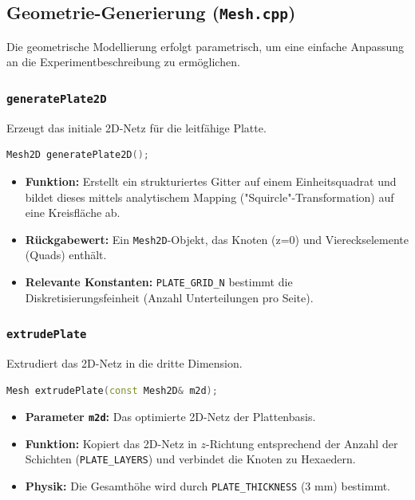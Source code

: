 \documentclass[a4paper,12pt]{article}
\begin{document}
\subsection{Geometrie-Generierung (\texttt{Mesh.cpp})}

Die geometrische Modellierung erfolgt parametrisch, um eine einfache Anpassung an die Experimentbeschreibung zu ermöglichen.

\subsubsection{\texttt{generatePlate2D}}
Erzeugt das initiale 2D-Netz für die leitfähige Platte.
\begin{lstlisting}[language=C++]
Mesh2D generatePlate2D();
\end{lstlisting}
\begin{itemize}
    \item \textbf{Funktion:} Erstellt ein strukturiertes Gitter auf einem Einheitsquadrat und bildet dieses mittels analytischem Mapping ("Squircle"-Transformation) auf eine Kreisfläche ab.
    \item \textbf{Rückgabewert:} Ein \texttt{Mesh2D}-Objekt, das Knoten (z=0) und Viereckselemente (Quads) enthält.
    \item \textbf{Relevante Konstanten:} \texttt{PLATE\_GRID\_N} bestimmt die Diskretisierungsfeinheit (Anzahl Unterteilungen pro Seite).
\end{itemize}

\subsubsection{\texttt{extrudePlate}}
Extrudiert das 2D-Netz in die dritte Dimension.
\begin{lstlisting}[language=C++]
Mesh extrudePlate(const Mesh2D& m2d);
\end{lstlisting}
\begin{itemize}
    \item \textbf{Parameter \texttt{m2d}:} Das optimierte 2D-Netz der Plattenbasis.
    \item \textbf{Funktion:} Kopiert das 2D-Netz in $z$-Richtung entsprechend der Anzahl der Schichten (\texttt{PLATE\_LAYERS}) und verbindet die Knoten zu Hexaedern.
    \item \textbf{Physik:} Die Gesamthöhe wird durch \texttt{PLATE\_THICKNESS} (3 mm) bestimmt.
\end{itemize}
\end{document}
